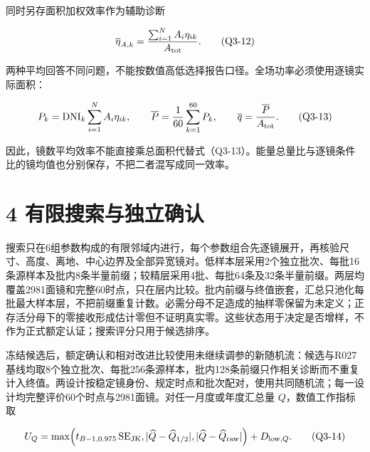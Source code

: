 \documentclass[UTF8,fontset=windows,zihao=-4]{ctexart}
\begin{document}
\par\noindent\begin{minipage}{\linewidth}
同时另存面积加权效率作为辅助诊断

\[
\overline\eta_{A,k}
=\frac{\sum_{i=1}^{N}A_i\eta_{ik}}{A_{\rm tot}} .
\tag{Q3-12}
\]
\end{minipage}\par

\par\noindent\begin{minipage}{\linewidth}
两种平均回答不同问题，不能按数值高低选择报告口径。全场功率必须使用逐镜实际面积：

\[
P_k=\mathrm{DNI}_k\sum_{i=1}^{N}A_i\eta_{ik},
\qquad
\overline P=\frac1{60}\sum_{k=1}^{60}P_k,
\qquad
\overline q=\frac{\overline P}{A_{\rm tot}} .
\tag{Q3-13}
\]
\end{minipage}\par

因此，镜数平均效率不能直接乘总面积代替式（Q3-13）。能量总量比与逐镜条件比的镜均值也分别保存，不把二者混写成同一效率。

\section*{4 有限搜索与独立确认}

搜索只在6组参数构成的有限邻域内进行，每个参数组合先逐镜展开，再核验尺寸、高度、离地、中心边界及全部异宽镜对。低样本层采用2个独立批次、每批16条源样本及批内8条半量前缀；较精层采用4批、每批64条及32条半量前缀。两层均覆盖2981面镜和完整60时点，只在层内比较。批内前缀与终值嵌套，汇总只池化每批最大样本层，不把前缀重复计数。必需分母不足造成的抽样零保留为未定义；正存活分母下的零接收形成估计零但不证明真实零。这些状态用于决定是否增样，不作为正式额定认证；搜索评分只用于候选排序。

\par\noindent\begin{minipage}{\linewidth}
冻结候选后，额定确认和相对改进比较使用未继续调参的新随机流：候选与R027基线均取8个独立批次、每批256条源样本，批内128条前缀只作相关诊断而不重复计入终值。两设计按稳定镜身份、规定时点和批次配对，使用共同随机流；每一设计均完整评价60个时点与2981面镜。对任一月度或年度汇总量 \(Q\)，数值工作指标取

\[
U_Q=\max\!\left(
t_{B-1,0.975}\,\mathrm{SE}_{\rm JK},
|\widehat Q-\widehat Q_{1/2}|,
|\widehat Q-\widehat Q_{\rm raw}|
\right)+D_{{\rm low},Q}.
\tag{Q3-14}
\]
\end{minipage}\par
\end{document}
